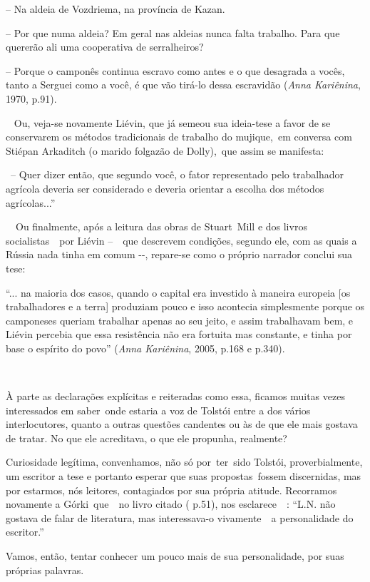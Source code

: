 -- Na aldeia de Vozdriema, na província de Kazan.

-- Por que numa aldeia? Em geral nas aldeias nunca falta trabalho. Para
que quererão ali uma cooperativa de serralheiros?

-- Porque o camponês continua escravo como antes e o que desagrada a
vocês, tanto a Serguei como a você, é que vão tirá-lo dessa escravidão
(\emph{Anna Kariênina}, 1970, p.91).

\emph{~} Ou, veja-se novamente Liévin, que já semeou sua ideia-tese a
favor de se conservarem os métodos tradicionais de trabalho do
mujique,~em conversa com Stiépan Arkaditch (o marido folgazão de
Dolly),~que assim se manifesta:

~-- Quer dizer então, que segundo você, o fator representado pelo
trabalhador agrícola deveria ser considerado e deveria orientar a
escolha dos métodos agrícolas...''

~~Ou finalmente, após a leitura das obras de Stuart~Mill e dos livros
socialistas~~por Liévin --~~que descrevem condições, segundo ele, com as
quais a Rússia nada tinha em comum -\/-, repare-se como o próprio
narrador conclui sua tese:

``... na maioria dos casos, quando o capital era investido à maneira
europeia {[}os trabalhadores e a terra{]} produziam pouco e isso
acontecia simplesmente porque os camponeses queriam trabalhar apenas ao
seu jeito, e assim trabalhavam bem, e Liévin percebia que essa
resistência não era fortuita mas constante, e tinha por base o espírito
do povo'' (\emph{Anna Kariênina}, 2005, p.168 e p.340).

~

À parte as declarações explícitas e reiteradas como essa, ficamos muitas
vezes interessados em saber~onde estaria a voz de Tolstói entre a dos
vários interlocutores, quanto a outras questões candentes ou às de que
ele mais gostava de tratar. No que ele acreditava, o que ele propunha,
realmente?

Curiosidade legítima, convenhamos, não só por~ter~sido Tolstói,
proverbialmente, um escritor a tese e portanto esperar que suas
propostas~fossem discernidas, mas por estarmos, nós leitores,
contagiados por sua própria atitude. Recorramos novamente a
Górki~que~~no livro citado ( p.51), nos esclarece~~: ``L.N. não gostava
de falar de literatura, mas interessava-o vivamente~~a personalidade do
escritor.''

Vamos, então, tentar conhecer um pouco mais de sua personalidade, por
suas próprias palavras.

